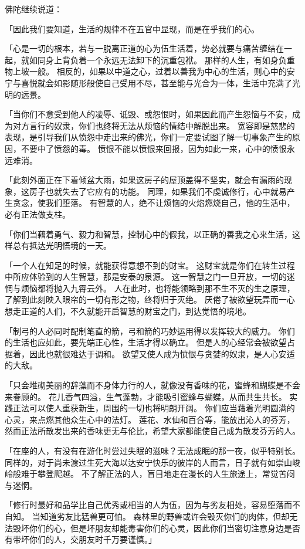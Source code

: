 \documentclass[twoside,openany]{book}
\begin{document}
佛陀继续说道：

「因此我们要知道，生活的规律不在五官中显现，而是在乎我们的心。

「心是一切的根本，若与一脱离正道的心为伍生活着，势必就要与痛苦缠结在一起，就如同身上背负着一个永远无法卸下的沉重包袱。
那样的人生，有如身负重物上坡一般。
相反的，如果以中道之心，过着以善我为中心的生活，则心中的安宁与喜悦就会如影随形般使自己受用不尽，甚至能与光合为一体，生活中充满了光明的远景。

「当你们不意受到他人的凌辱、诋毁、或怨恨时，如果因此而产生怨恼与不安，成为对方言行的奴隶，你们也终将无法从烦恼的情结中解脱出来。
宽容即是慈悲的表现，是引导我们从愤怨中走出来的佛光，你们一定要试图了解一切事象产生的原因，不要中了愤怨的毒。
愤恨不能以愤恨来回报，因为如此一来，心中的愤恨永远难消。

「此刻外面正在下着倾盆大雨，如果这房子的屋顶盖得不坚实，就会有漏雨的现象，这房子也就失去了它应有的功能。
同理，如果我们不虔诚修行，心中就易产生贪念，使我们堕落。
有智慧的人，绝不让烦恼的火焰燃烧自己，他的生活中，必有正法做支柱。

「你们当藉着勇气、毅力和智慧，控制心中的假我，以正确的善我之心来生活，这样总有抵达光明悟境的一天。

「一个人在知足的时候，就能获得意想不到的财宝。
这财宝就是你们在转生过程中所应体验到的人生智慧，那是安泰的泉源。
这一智慧之门一旦开放，一切的迷惘与烦恼都将抛入九霄云外。
人在此时，也将能领略到那不生不灭的生之原理，了解到此刻映入眼帘的一切有形之物，终将归于灭绝。
厌倦了被欲望玩弄而一心想走正道的人们，不久就能开启智慧的财宝之门，到达觉悟的境地。

「制弓的人必同时配制笔直的箭，弓和箭的巧妙运用得以发挥较大的威力。
你们的生活也应如此，要先端正心性，生活才得以确立。
但是人的心经常会被欲望占据着，因此也就很难达于调和。
欲望又使人成为愤恨与贪婪的奴隶，是人心安适的大敌。

「只会堆砌美丽的辞藻而不身体力行的人，就像没有香味的花，蜜蜂和蝴蝶是不会来眷顾的。
花儿香气四溢，生气蓬勃，才能吸引蜜蜂与蝴蝶，从而共生共长。
实践正法可以使人重获新生，周围的一切也将明朗开阔。
你们应当藉着光明圆满的心灵，来点燃其他众生心中的法灯。
莲花、水仙和百合等，能放出沁人的芬芳，然而正法所散发出来的香味更无与伦比，希望大家都能使自己成为散发芬芳的人。

「在座的人，有没有在游化时尝过失眠的滋味？无法成眠的那一夜，似乎特别长。
同样的，对于尚未渡过生死大海以达安宁快乐的彼岸的人而言，日子就有如崇山峻岭般难于攀登爬越。
不了解正法的人，盲目地走在漫长的人生旅途上，常觉苦闷与迷惘。

「修行时最好和品学比自己优秀或相当的人为伍，因为与劣友相处，容易堕落而不自知。
当知道劣友比猛兽更可怕。
森林里的野兽或许会毁灭你们的肉体，但却无法毁坏你们的心，但是坏朋友却能毒害你们的心灵，因此你们当密切注意身边是否有带坏你们的人，交朋友时千万要谨慎。」
\end{document}
